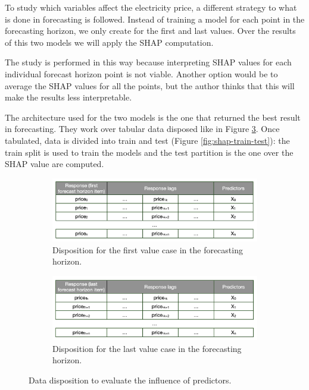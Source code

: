 To study which variables affect the electricity price, a different strategy to what is done in forecasting is followed. Instead of training a model for each point in the forecasting horizon, we only create for the first and last values. Over the results of this two models we will apply the SHAP computation.

The study is performed in this way because interpreting SHAP values for each individual forecast horizon point is not viable. Another option would be to average the SHAP values for all the points, but the author thinks that this will make the results less interpretable.

The architecture used for the two models is the one that returned the best result in forecasting. They work over tabular data disposed like in Figure \ref{fig:shap-arrangement}. Once tabulated, data is divided into train and test (Figure \ref{fig:shap-train-test}): the train split is used to train the models and the test partition is the one over the SHAP value are computed.

\begin{figure}[H]
\centering
    \begin{subfigure}{.95\textwidth}
        \centering
        \includegraphics[width=1\linewidth]{images/methodology/shap_arrangement_first}
        \caption{Disposition for the first value case in the forecasting horizon.}
        \label{fig:shap-arrangement-first}
    \end{subfigure}
    \vspace{0.3cm}
    \begin{subfigure}{.95\textwidth}
        \centering
        \includegraphics[width=1\linewidth]{images/methodology/shap_arrangement_last}
        \caption{Disposition for the last value case in the forecasting horizon.}
        \label{fig:shap-arrangement-last}
    \end{subfigure}

    \caption{Data disposition to evaluate the influence of predictors.}
    \label{fig:shap-arrangement}
\end{figure}

